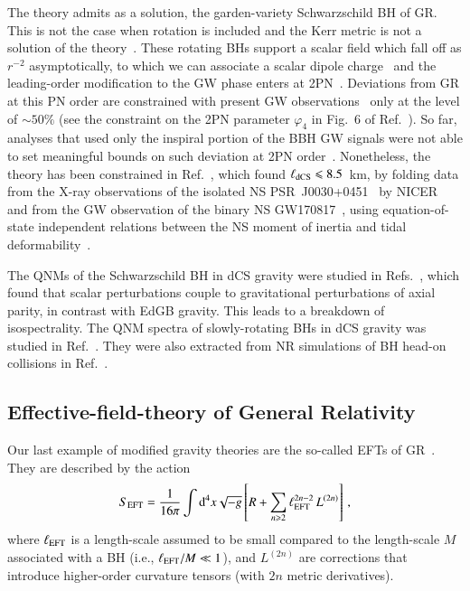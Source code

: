 \documentclass[twocolumn,
               prd,
               aps,
               superscriptaddress,
               tightenlines,
               nofootinbib,
               eqsecnum,
               amsfonts,
               amsmath,
               longbibliography]{revtex4-1}
\newcommand{\dd}{{\rm d}}
\begin{document}
The theory admits as a solution, the garden-variety Schwarzschild BH of GR.
This is not the case when rotation is included and the Kerr metric is not a
solution of the theory~\cite{Jackiw:2003pm}.
%
These rotating BHs support a scalar field which fall off as
$r^{-2}$ asymptotically, to which we can associate a scalar dipole
charge~\cite{Yunes:2009hc,Konno:2009kg} and
%
the leading-order modification to the GW phase enters at 2PN~\cite{Yagi:2011xp}.
%
Deviations from GR at this PN order are constrained with present GW observations~\cite{LIGOScientific:2021sio}
only at the level of $\sim 50\%$ (see the constraint on the 2PN parameter $\varphi_4$ in Fig.~6 of
Ref.~\cite{LIGOScientific:2021sio}). So far, analyses that used only the inspiral portion of
the BBH GW signals were not able to set meaningful bounds on such deviation at 2PN order~\cite{Nair:2019iur,Perkins:2021mhb}.
%
Nonetheless, the theory has been constrained in Ref.~\cite{Silva:2020acr}, which found
%
$\ell_{\rm dCS} \leqslant 8.5$~km,
%
by folding data from the X-ray observations of the isolated NS
PSR~J0030+0451~\cite{Lommen:2000yt,NANOGrav:2017wvv} by
NICER~\cite{Riley:2019yda,Miller:2019cac} and from the GW observation of the binary
NS GW170817~\cite{TheLIGOScientific:2017qsa,LIGOScientific:2018cki}, using
equation-of-state independent relations between the NS moment of inertia and tidal deformability~\cite{Yagi:2013bca,Yagi:2013awa,Gupta:2017vsl}.

The QNMs of the Schwarzschild BH in dCS gravity were studied in
Refs.~\cite{Yunes:2007ss,Cardoso:2009pk,Molina:2010fb}, which found that scalar
perturbations couple to gravitational perturbations of axial parity, in contrast
with EdGB gravity.
%
This leads to a breakdown of isospectrality. The QNM spectra of slowly-rotating BHs in dCS gravity was
studied in Ref.~\cite{Srivastava:2021imr,Wagle:2021tam}.
%
They were also extracted from NR simulations of BH head-on collisions in Ref.~\cite{Okounkova:2019dfo}.

\subsection{Effective-field-theory of General Relativity}

Our last example of modified gravity theories are the so-called
EFTs of GR~\cite{Endlich:2017tqa,Sennett:2019bpc,deRham:2020ejn,Cano:2020cao,Cano:2021myl}.
%
They are described by the action
%
\begin{equation} \label{eq:action_eft}
    S_{\rm EFT} = \frac{1}{16 \pi}
    \int \dd^4x \sqrt{-g}
    \left[ R
    +
    \sum_{n \geqslant 2} \ell_{\rm EFT}^{2n - 2}\, L^{(2n)}
    \right]\,,
\end{equation}
%
where $\ell_{\rm EFT}$ is a length-scale assumed to be small compared to the length-scale $M$
associated with a BH (i.e., $\ell_{\rm EFT} / M \ll 1$), and $L^{(2n)}$ are corrections
that introduce higher-order curvature tensors (with $2n$ metric derivatives).
\end{document}
